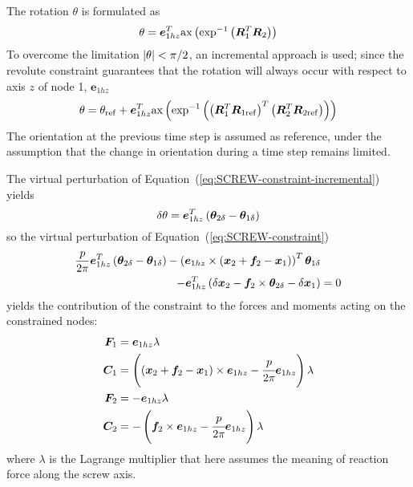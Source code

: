 \documentclass[10pt,dvips,fleqn,subeqn]{report}
\newcommand{\T}[1]{\bm{#1}}
\begin{document}
The rotation $\theta$ is formulated as
\begin{equation}
	\theta = \T{e}_{1hz}^T \llk{ax}\plbr{\llk{exp}^{-1}\plbr{\T{R}_1^T \T{R}_2}}
\end{equation}
To overcome the limitation $\left| \theta \right|<\pi/2$, an incremental
approach is used; since the revolute constraint guarantees that
the rotation will always occur with respect to axis $z$ of node 1,
$\T{e}_{1hz}$
\begin{equation}
	\label{eq:SCREW-constraint-incremental}
	\theta = \theta_{\llk{ref}}
		+ \T{e}_{1hz}^T \llk{ax}\plbr{\llk{exp}^{-1}\plbr{\plbr{\T{R}_1^T \T{R}_{1\llk{ref}}}^T \plbr{\T{R}_2^T \T{R}_{2\llk{ref}}}}}
\end{equation}
The orientation at the previous time step is assumed as reference,
under the assumption that the change in orientation during a time step 
remains limited.

The virtual perturbation of Equation~(\ref{eq:SCREW-constraint-incremental})
yields
\begin{equation}
	\delta\theta = \T{e}_{1hz}^T\plbr{\T{\theta}_{2\delta} - \T{\theta}_{1\delta}}
\end{equation}
so the virtual perturbation of Equation~(\ref{eq:SCREW-constraint})
\begin{align*}
	\frac{p}{2 \pi} \T{e}_{1hz}^T\plbr{\T{\theta}_{2\delta} - \T{\theta}_{1\delta}}
	- \plbr{\T{e}_{1hz} \times \plbr{\T{x}_2 + \T{f}_2 - \T{x}_1}}^T \T{\theta}_{1\delta} & \\
	- \T{e}_{1hz}^T\plbr{\delta\T{x}_2 - \T{f}_2 \times \T{\theta}_{2\delta} - \delta\T{x}_1} &= 0
\end{align*}
yields the contribution of the constraint to the forces and moments
acting on the constrained nodes:
\begin{align*}
	\T{F}_1 &= \T{e}_{1hz} \lambda \\
	\T{C}_1 &= \plbr{
		\plbr{\T{x}_2 + \T{f}_2 - \T{x}_1} \times \T{e}_{1hz} 
		- \cfrac{p}{2 \pi} \T{e}_{1hz}
	} \lambda \\
	\T{F}_2 &= - \T{e}_{1hz} \lambda \\
	\T{C}_2 &= - \plbr{
		\T{f}_2 \times \T{e}_{1hz}
		- \cfrac{p}{2 \pi} \T{e}_{1hz}
	} \lambda
\end{align*}
where $\lambda$ is the Lagrange multiplier that here assumes the meaning
of reaction force along the screw axis.
\end{document}
